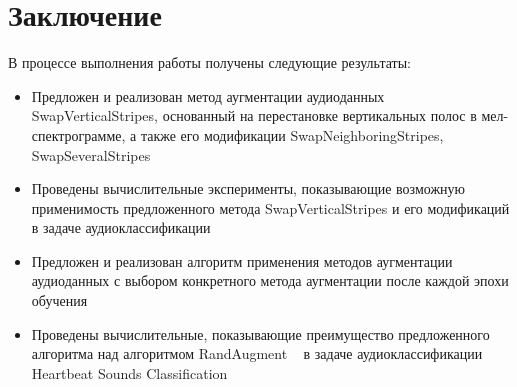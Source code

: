 \documentclass[12pt, fleqn]{article}
\begin{document}
\section{Заключение}

В процессе выполнения работы получены следующие результаты:

\begin{itemize}
    \item Предложен и реализован метод аугментации аудиоданных SwapVerticalStripes, основанный на перестановке вертикальных полос в мел-спектрограмме, а также его модификации SwapNeighboringStripes, SwapSeveralStripes 
    \item Проведены вычислительные эксперименты, показывающие возможную применимость предложенного метода SwapVerticalStripes и его модификаций в задаче аудиоклассификации
    \item Предложен и реализован алгоритм применения методов аугментации аудиоданных с выбором конкретного метода аугментации после каждой эпохи обучения
    \item Проведены вычислительные, показывающие преимущество предложенного алгоритма над алгоритмом RandAugment ~\cite{RandAugment} в задаче аудиоклассификации Heartbeat Sounds Classification ~\cite{HeartbeatSoundsArticle}~\cite{HeartbeatSoundsKaggle}
\end{itemize}
\end{document}
